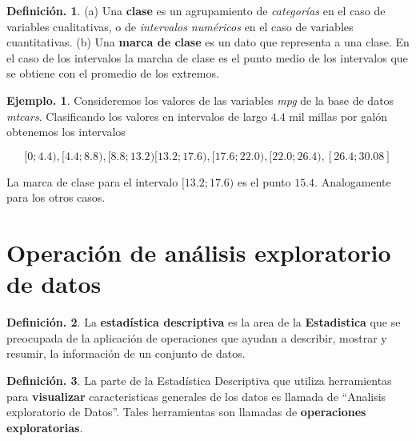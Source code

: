 \documentclass[]{book}
\theoremstyle{definition}
\newtheorem{definition}{Definición.}[chapter]
\theoremstyle{definition}
\newtheorem{example}{Ejemplo.}[chapter]
\theoremstyle{definition}
\theoremstyle{remark}
\begin{document}
\begin{definition}
\protect\hypertarget{def:unnamed-chunk-35}{}{\label{def:unnamed-chunk-35} }(a) Una \textbf{clase} es un agrupamiento de \emph{categorías} en
el caso de variables cualitativas, o de
\emph{intervalos numéricos} en el caso de variables
cuantitativas. (b) Una \textbf{marca de clase} es un
dato que representa a una clase. En el caso de los
intervalos la marcha de clase es el punto medio
de los intervalos que se obtiene con el promedio de los
extremos.
\end{definition}

\begin{example}
\protect\hypertarget{exm:unnamed-chunk-36}{}{\label{exm:unnamed-chunk-36} }Consideremos los valores de las variables \emph{mpg} de la
base de datos \emph{mtcars}. Clasificando los
valores en intervalos de largo \(4.4\) mil millas por galón
obtenemos los intervalos

\[ [0 ; 4.4), [4.4 ; 8.8), [8.8 ; 13.2) [13.2 ; 17.6),
[17.6 ; 22.0), [22.0 ; 26.4), [26.4 ; 30.08] \]

La marca de clase para el intervalo \([13.2 ; 17.6)\) es
el punto \(15.4\). Analogamente para los
otros casos.
\end{example}

\hypertarget{operaciuxf3n-de-anuxe1lisis-exploratorio-de-datos}{%
\section{Operación de análisis exploratorio de datos}\label{operaciuxf3n-de-anuxe1lisis-exploratorio-de-datos}}

\begin{definition}
\protect\hypertarget{def:unnamed-chunk-37}{}{\label{def:unnamed-chunk-37} }La \textbf{estadística descriptiva} es la area de la
\textbf{Estadistica} que se preocupada de la
aplicación de operaciones que ayudan a describir, mostrar
y resumir, la información de un conjunto
de datos.
\end{definition}

\begin{definition}
\protect\hypertarget{def:unnamed-chunk-38}{}{\label{def:unnamed-chunk-38} }La parte de la Estadística Descriptiva que utiliza
herramientas para \textbf{visualizar}
caracteristicas generales de los datos es llamada de
``Analisis exploratorio de Datos''. Tales
herramientas son llamadas de \textbf{operaciones
exploratorias}.
\end{definition}
\end{document}
